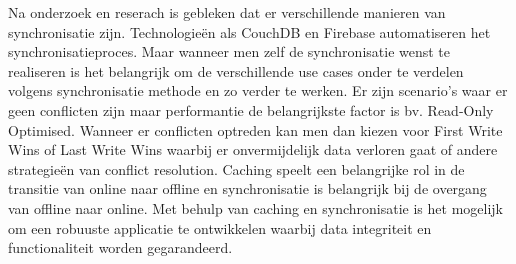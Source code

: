 Na onderzoek en reserach is gebleken dat er verschillende manieren van synchronisatie zijn. Technologie\"en als CouchDB en Firebase automatiseren het synchronisatieproces. Maar wanneer men zelf de synchronisatie wenst te realiseren is het belangrijk om de verschillende use cases onder te verdelen volgens synchronisatie methode en zo verder te werken. Er zijn scenario's waar er geen conflicten zijn maar performantie de belangrijkste factor is bv. Read-Only Optimised. Wanneer er conflicten optreden kan men dan kiezen voor First Write Wins of Last Write Wins waarbij er onvermijdelijk data verloren gaat of andere strategie\"en van conflict resolution. Caching speelt een belangrijke rol in de transitie van online naar offline en synchronisatie is belangrijk bij de overgang van offline naar online. Met behulp van caching en synchronisatie is het mogelijk om een robuuste applicatie te ontwikkelen waarbij data integriteit en functionaliteit worden gegarandeerd.